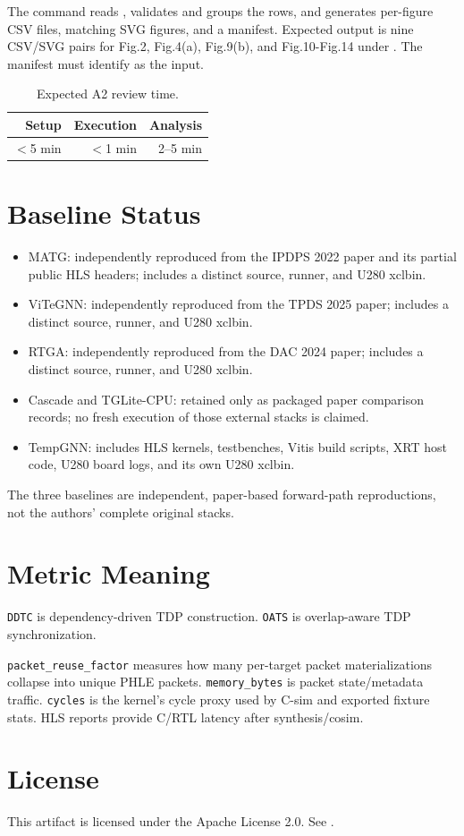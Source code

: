 \documentclass[conference]{IEEEtran}
\begin{document}
The command reads , validates and groups the rows, and
generates per-figure CSV files, matching SVG figures, and a manifest. Expected
output is nine CSV/SVG pairs for Fig.2, Fig.4(a), Fig.9(b), and Fig.10-Fig.14
under . The manifest must identify
 as the input.

\begin{table}[h]
\caption{Expected A2 review time.}
\centering
\begin{tabular}{rrr}
\toprule
Setup & Execution & Analysis \\
\midrule
$<$5 min & $<$1 min & 2--5 min \\
\bottomrule
\end{tabular}
\end{table}

\balance
\section{Baseline Status}

\begin{itemize}
\item MATG: independently reproduced from the IPDPS 2022 paper and its partial
public HLS headers; includes a distinct source, runner, and U280 xclbin.
\item ViTeGNN: independently reproduced from the TPDS 2025 paper; includes a
distinct source, runner, and U280 xclbin.
\item RTGA: independently reproduced from the DAC 2024 paper; includes a
distinct source, runner, and U280 xclbin.
\item Cascade and TGLite-CPU: retained only as packaged paper comparison
records; no fresh execution of those external stacks is claimed.
\item TempGNN: includes HLS kernels, testbenches, Vitis build scripts, XRT host
code, U280 board logs, and its own U280 xclbin.
\end{itemize}

The three baselines are independent, paper-based forward-path reproductions,
not the authors' complete original stacks.

\section{Metric Meaning}

\texttt{DDTC} is dependency-driven TDP construction. \texttt{OATS} is
overlap-aware TDP synchronization.

\texttt{packet\_reuse\_factor} measures how many per-target packet
materializations collapse into unique PHLE packets. \texttt{memory\_bytes} is
packet state/metadata traffic. \texttt{cycles} is the kernel's cycle proxy used
by C-sim and exported fixture stats. HLS reports provide C/RTL latency after
synthesis/cosim.

\section{License}

This artifact is licensed under the Apache License 2.0. See .
\end{document}
